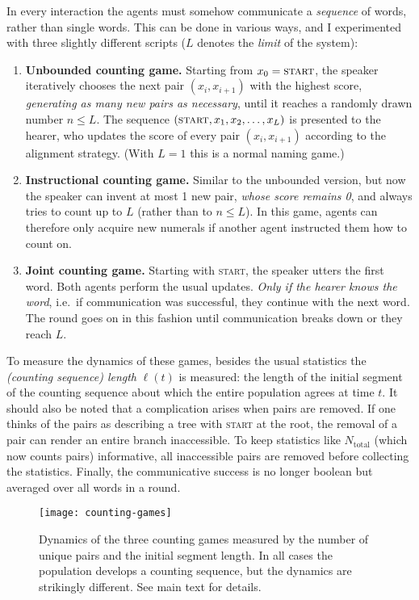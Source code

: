 \documentclass{../src/bcthesispart}
\begin{document}
In every interaction the agents must somehow communicate a \emph{sequence} of words, rather than single words.
This can be done in various ways, and I experimented with three slightly different scripts ($L$ denotes the \emph{limit} of the system):
\begin{enumerate}
	\item \textbf{Unbounded counting game.}
	Starting from $x_0 = \textsc{start}$, the speaker iteratively chooses the next pair $(x_i, x_{i+1})$ with the highest score, \emph{generating as many new pairs as necessary}, until it reaches a randomly drawn number $n\le L$. 
	The sequence $(\textsc{start}, x_1, x_2, \dots, x_L)$ is presented to the hearer, who updates the score of every pair $(x_i, x_{i+1})$ according to the alignment strategy.
	(With $L=1$ this is a normal naming game.)

	\item \textbf{Instructional counting game.} 
	Similar to the unbounded version, but now the speaker can invent at most 1 new pair, \emph{whose score remains 0}, and always tries to count up to $L$ (rather than to $n \le L$). 
	In this game, agents can therefore only acquire new numerals if another agent instructed them how to count on.
	
	
	\item \textbf{Joint counting game.}
	Starting with \textsc{start}, the speaker utters the first word. 
	Both agents perform the usual updates.
	\emph{Only if the hearer knows the word}, i.e.\ if communication was successful, they continue with the next word.
	The round goes on in this fashion until communication breaks down or they reach $L$.
\end{enumerate}

To measure the dynamics of these games, besides the usual statistics the \emph{(counting sequence) length} $\ell(t)$ is measured: the length of the initial segment of the counting sequence about which the entire population agrees at time $t$.
It should also be noted that a complication arises when pairs are removed.
If one thinks of the pairs as describing a tree with \textsc{start} at the root, the removal of a pair can render an entire branch inaccessible.
To keep statistics like $N_{\text{total}}$ (which now counts pairs) informative, all inaccessible pairs are removed before collecting the statistics.
Finally, the communicative success is no longer boolean but averaged over all words in a round.



\begin{SCfigure}
	\texttt{[image: counting-games]}
	
	\caption{%
	Dynamics of the three counting games measured by the number of unique pairs and the initial segment length. 
	In all cases the population develops a counting sequence, but the dynamics are strikingly different. See main text for details.
	\label{fig:counting-games}}
\end{SCfigure}
\end{document}
